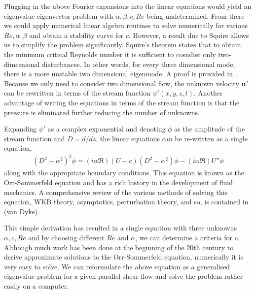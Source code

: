 Plugging in the above Fourier expansions into the linear equations would yield an eigenvalue-eigenvector problem with $\alpha,\beta,c,Re$ being undetermined. From there we could apply numerical linear algebra routines to solve numerically for various $Re,\alpha,\beta$ and obtain a stability curve for $c$. However, a result due to Squire allows us to simplify the problem significantly. Squire's theorem states that to obtain the minimum critical Reynolds number it is sufficient to cosndier only two-dimesnional disturbances\cite{drazinreid}. In other words, for every three dimensional mode, there is a more unstable two dimensional eigenmode. A proof is provided in \cite{drazinreid}.  Because we only need to consider two dimensional flow, the unknown velocity $\bm{u}'$ can be rewritten in terms of the stream function $\psi'(x,y,z,t)$. Another advantage of writing the equations in terms of the stream function is that the pressure is eliminated further reducing the number of unknowns. 

Expanding $\psi'$ as a complex exponential and denoting $\phi$ as the amplitude of the stream function and $D=d/dz$, the linear equations can be re-written as a single equation, 
\begin{align}
(D^{2}-\alpha^{2})^{2}\phi = (i\alpha \Re)(U-c)(D^{2}-\alpha^{2})\phi -(i\alpha \Re)U''\phi
\end{align}
along with the appropriate boundary conditions. This equation is known as the Orr-Sommerfeld equation and has a rich history in the development of fluid mechanics. A comprehensive review of the various methods of solving this equation, WKB theory, asymptotics, perturbation theory, and so, is contained in \cite{drazinreid} (van Dyke). 

This simple derivation has resulted in a single equation with three unknowns $\alpha,c,Re$ and by choosing different $Re$ and $\alpha$, we can determine a criteria for $c$. Although much work has been done at the beginning of the 20th century to derive approximate solutions to the Orr-Sommerfeld equation, numerically it is very easy to solve. We can reformulate the above equation as a generalised eigenvalue problem for a given parallel shear flow and solve the problem rather easily on a computer\cite{trefethen_spectral}.

